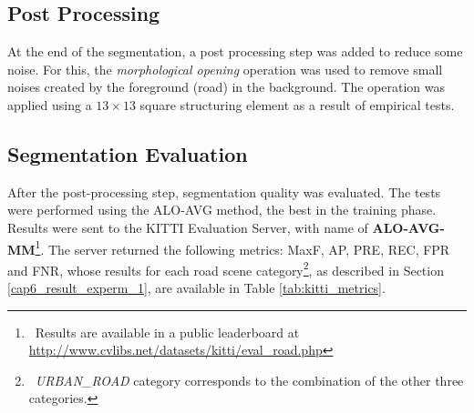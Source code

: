 \subsection{Post Processing}
\label{cap6_pos_processamento}

At the end of the segmentation, a post processing step was added to reduce some noise.
For this, the \textit{morphological opening} operation was used to remove small noises created by the foreground (road) in the background.
The operation was applied using a $13 \times 13$ square structuring element as a result of empirical tests.

% 

\subsection{Segmentation Evaluation}
\label{cap6_resultados_segmentacao}

After the post-processing step, segmentation quality was evaluated.
The tests were performed using the ALO-AVG method, the best in the training phase.
Results were sent to  the KITTI Evaluation Server, with name of \textbf{ALO-AVG-MM}\footnote{~Results are available in a public leaderboard at \url{http://www.cvlibs.net/datasets/kitti/eval_road.php}}.
The server returned the following metrics: MaxF, AP, PRE, REC, FPR and FNR, whose results for each road scene category\footnote{~\textit{URBAN\_ROAD} category corresponds to the combination of the other three categories.}, as described in Section \ref{cap6_result_experm_1}, are available in Table \ref{tab:kitti_metrics}.

